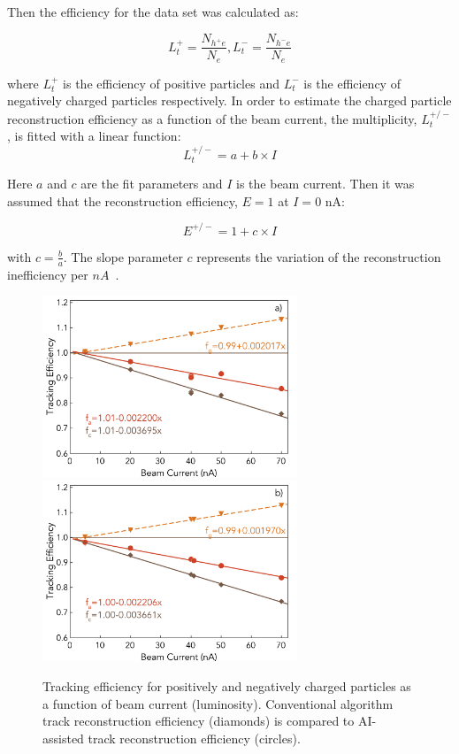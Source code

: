 Then the efficiency for the data set was calculated as:

\begin{equation}
L_t^+ = \frac{N_{h^+e}}{N_e} , L_t^- = \frac{N_{h^-e}}{N_e} 
\end{equation}

where $L_t^+$ is the efficiency of positive particles and $L_t^-$ is the efficiency of negatively charged particles respectively. 
In order to estimate the charged particle reconstruction efficiency as a function of the beam current, the multiplicity, $L_t^{+/-}$, is fitted with a linear function:
\begin{equation}
L_t^{+/-} = a + b\times I 
\end{equation}

Here $a$ and $c$ are the fit parameters and $I$ is the beam current. Then it was assumed that the reconstruction efficiency, $E=1$ at $I=0$ nA:

\begin{equation}
E^{+/-} = 1 + c \times I 
\end{equation}

with $c=\frac{b}{a}$. The slope parameter $c$ represents the variation of the reconstruction inefficiency per $nA$~\cite{Stepanyan:2020bg}.
 
 \begin{figure}[!ht]
\begin{center}
 \includegraphics[width=3.0in]{images/figure_lscan_pos.pdf}
 \includegraphics[width=3.0in]{images/figure_lscan_neg.pdf}
\caption {Tracking efficiency for positively and negatively charged particles as a function of beam current (luminosity).  Conventional algorithm 
track reconstruction efficiency (diamonds) is compared to AI-assisted track reconstruction efficiency (circles). }
 \label{lumi:scan}
 \end{center}
\end{figure}

